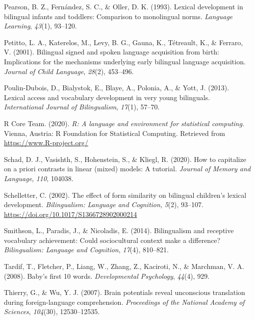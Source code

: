 \documentclass[
  english,
  man,man,floatsintext]{apa6}
\newlength{\cslhangindent}
\newenvironment{CSLReferences}[2] %
 {%
  \setlength{\parindent}{0pt}
  \ifodd #1 \everypar{\setlength{\hangindent}{\cslhangindent}}\ignorespaces\fi
  \ifnum #2 > 0
  \setlength{\parskip}{#2\baselineskip}
  \fi
 }%
 {}
\begin{document}
\begin{CSLReferences}{1}{0}
\leavevmode{}%
Pearson, B. Z., Fernández, S. C., \& Oller, D. K. (1993). Lexical development in bilingual infants and toddlers: Comparison to monolingual norms. \emph{Language Learning}, \emph{43}(1), 93--120.

\leavevmode{}%
Petitto, L. A., Katerelos, M., Levy, B. G., Gauna, K., Tétreault, K., \& Ferraro, V. (2001). Bilingual signed and spoken language acquisition from birth: Implications for the mechanisms underlying early bilingual language acquisition. \emph{Journal of Child Language}, \emph{28}(2), 453--496.

\leavevmode{}%
Poulin-Dubois, D., Bialystok, E., Blaye, A., Polonia, A., \& Yott, J. (2013). Lexical access and vocabulary development in very young bilinguals. \emph{International Journal of Bilingualism}, \emph{17}(1), 57--70.

\leavevmode{}%
R Core Team. (2020). \emph{R: A language and environment for statistical computing}. Vienna, Austria: R Foundation for Statistical Computing. Retrieved from \url{https://www.R-project.org/}

\leavevmode{}%
Schad, D. J., Vasishth, S., Hohenstein, S., \& Kliegl, R. (2020). How to capitalize on a priori contrasts in linear (mixed) models: A tutorial. \emph{Journal of Memory and Language}, \emph{110}, 104038.

\leavevmode{}%
Schelletter, C. (2002). The effect of form similarity on bilingual children's lexical development. \emph{Bilingualism: Language and Cognition}, \emph{5}(2), 93--107. \url{https://doi.org/10.1017/S1366728902000214}

\leavevmode{}%
Smithson, L., Paradis, J., \& Nicoladis, E. (2014). Bilingualism and receptive vocabulary achievement: Could sociocultural context make a difference? \emph{Bilingualism: Language and Cognition}, \emph{17}(4), 810--821.

\leavevmode{}%
Tardif, T., Fletcher, P., Liang, W., Zhang, Z., Kaciroti, N., \& Marchman, V. A. (2008). Baby's first 10 words. \emph{Developmental Psychology}, \emph{44}(4), 929.

\leavevmode{}%
Thierry, G., \& Wu, Y. J. (2007). Brain potentials reveal unconscious translation during foreign-language comprehension. \emph{Proceedings of the National Academy of Sciences}, \emph{104}(30), 12530--12535.


\end{CSLReferences}
\end{document}

